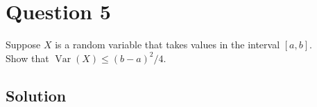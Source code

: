 \section*{Question 5}

Suppose \(X\) is a random variable that takes values in the interval \([a, b]\).\\
Show that \( \operatorname{Var}{(X)} \leq {(b - a)}^2/4 \).

\subsection*{Solution}
